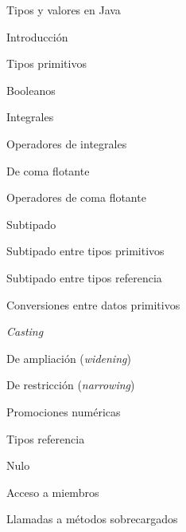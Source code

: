 \begin{longenum}
\begin{longenum}
        \item Tipos y valores en Java
        \begin{longenum}
            \item Introducción
            \item Tipos primitivos
            \begin{longenum}
                \item Booleanos
                \item Integrales
                \begin{longenum}
                    \item Operadores de integrales
                \end{longenum}
                \item De coma flotante
                \begin{longenum}
                    \item Operadores de coma flotante
                \end{longenum}
                \item Subtipado
                \begin{longenum}
                    \item Subtipado entre tipos primitivos
                    \item Subtipado entre tipos referencia
                \end{longenum}
                \item Conversiones entre datos primitivos
                \begin{longenum}
                    \item \textit{Casting}
                    \item De ampliación (\textit{widening})
                    \item De restricción (\textit{narrowing})
                \end{longenum}
                \item Promociones numéricas
            \end{longenum}
            \item Tipos referencia
            \begin{longenum}
                \item Nulo
                \item Acceso a miembros
                \begin{longenum}
                    \item Llamadas a métodos sobrecargados

\end{longenum}
\end{longenum}
\end{longenum}
\end{longenum}
\end{longenum}
